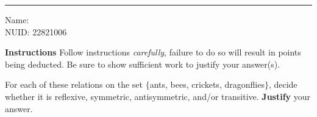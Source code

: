 \documentclass[10pt]{exam}
\begin{document}
\hrule

\vspace{.50cm} Name:
\\ NUID: 22821006
\vspace{.50cm}

\textbf{Instructions} Follow instructions \emph{carefully}, failure to do so will result in points being deducted. Be sure to show sufficient work to justify your answer(s).

\begin{questions}

\question[12] For each of these relations on the set $\{$ants, bees, crickets, dragonflies$\}$, decide whether it is reflexive, symmetric, antisymmetric, and/or transitive. \textbf{Justify} your answer.



\end{questions}
\end{document}
